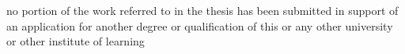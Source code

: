 no portion of the work referred to in the thesis has been submitted in support of an application for another degree or qualification of this or any other university or other institute of learning